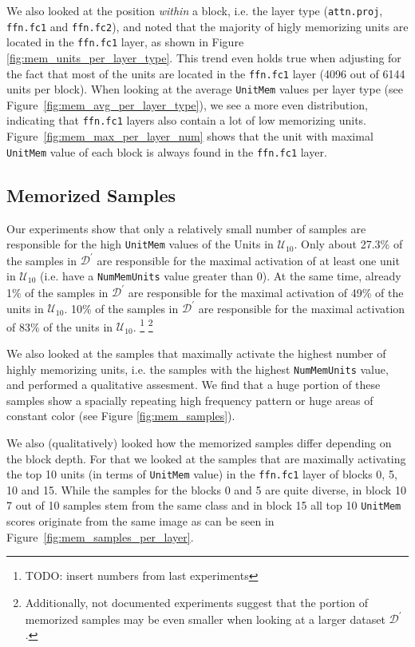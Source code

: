 \documentclass{article} %
\begin{document}
We also looked at the position \textit{within} a block, i.e. the layer type (\texttt{attn.proj}, \texttt{ffn.fc1} and \texttt{ffn.fc2}), and noted that the majority of higly memorizing units are located in the \texttt{ffn.fc1} layer, as shown in Figure \ref{fig:mem_units_per_layer_type}.
This trend even holds true when adjusting for the fact that most of the units are located in the \texttt{ffn.fc1} layer (4096 out of 6144 units per block).
When looking at the average \texttt{UnitMem} values per layer type (see Figure~\ref{fig:mem_avg_per_layer_type}), we see a more even distribution, indicating that \texttt{ffn.fc1} layers also contain a lot of low memorizing units.
Figure~\ref{fig:mem_max_per_layer_num} shows that the unit with maximal \texttt{UnitMem} value of each block is always found in the \texttt{ffn.fc1} layer.

\subsection{Memorized Samples}
Our experiments show that only a relatively small number of samples are responsible for the high \texttt{UnitMem} values of the Units in $\mathcal{U}_{10}$.
Only about 27.3\% of the samples in $\mathcal{D}^\prime$ are responsible for the maximal activation of at least one unit in $\mathcal{U}_{10}$ (i.e. have a \texttt{NumMemUnits} value greater than 0).
At the same time, already 1\% of the samples in $\mathcal{D}^\prime$ are responsible for the maximal activation of 49\% of the units in $\mathcal{U}_{10}$.
10\% of the samples in $\mathcal{D}^\prime$ are responsible for the maximal activation of 83\% of the units in $\mathcal{U}_{10}$.
\footnote{TODO: insert numbers from last experiments}
\footnote{Additionally, not documented experiments suggest that the portion of memorized samples may be even smaller when looking at a larger dataset $\mathcal{D}^\prime$.}

We also looked at the samples that maximally activate the highest number of highly memorizing units, i.e. the samples with the highest \texttt{NumMemUnits} value, and performed a qualitative assesment.
We find that a huge portion of these samples show a spacially repeating high frequency pattern or huge areas of constant color (see Figure \ref{fig:mem_samples}).

We also (qualitatively) looked how the memorized samples differ depending on the block depth.
For that we looked at the samples that are maximally activating the top 10 units (in terms of \texttt{UnitMem} value) in the \texttt{ffn.fc1} layer of blocks 0, 5, 10 and 15.
While the samples for the blocks 0 and 5 are quite diverse, in block 10 7 out of 10 samples stem from the same class and in block 15 all top 10 \texttt{UnitMem} scores originate from the same image as can be seen in Figure~\ref{fig:mem_samples_per_layer}.
\end{document}
